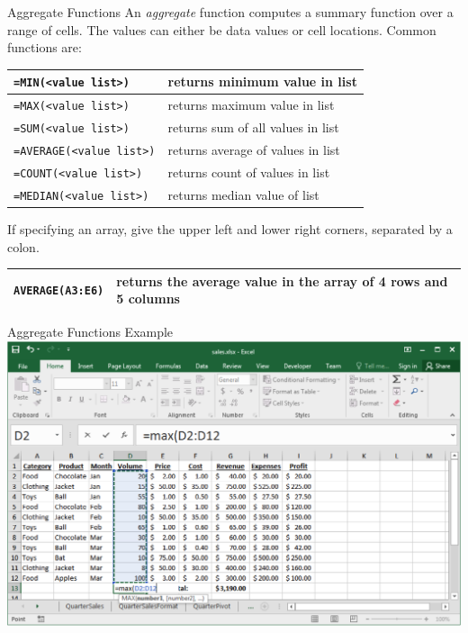 \documentclass[xcolor=svgnames]{beamer}
\begin{document}
\begin{frame}[fragile]{Aggregate Functions}
An \emph{aggregate} function computes a summary function over a range of cells.  The values can either be data values or cell locations. 
Common functions are:
\begin{center}
\begin{tabular}{|l|l|}
\hline
{\tt =MIN(<value list>)} 	& returns minimum value in list \\ \hline
{\tt =MAX(<value list>)}	& returns maximum value in list\\\hline
{\tt =SUM(<value list>)}	& returns sum of all values in list\\\hline
{\tt =AVERAGE(<value list>)} 	& returns average of values in list\\\hline
{\tt =COUNT(<value list>)} 	& returns count of values in list\\\hline
{\tt =MEDIAN(<value list>)} 	& returns median value of list \\\hline
\end{tabular}
\end{center}
If specifying an array, give the upper left and lower right corners, separated by a colon.
\begin{center}
\begin{tabular}{|l|p{6cm}|}
\hline
 {\tt AVERAGE(A3:E6)}  & returns the average value in the array of 4 rows and 5 columns\\\hline
\end{tabular}
\end{center}
\end{frame}

\begin{frame}{Aggregate Functions Example}
\hspace*{-6mm}                                                           
 \includegraphics[width=1.1\textwidth]{aggregate}
\end{frame}
\end{document}
